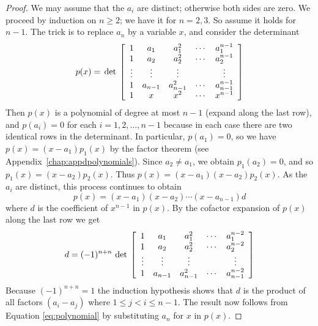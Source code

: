 \begin{proof}
We may assume that the $a_{i}$ are distinct; otherwise both sides are zero. We proceed by induction on $n \geq 2$; we have it for $n = 2, 3$. So assume it holds for $n - 1$. The trick is to replace $a_{n}$ by a variable $x$, and consider the determinant
\begin{equation*}
p(x) = \thinspace\operatorname{det\medspace} \left[ \begin{array}{ccccc}
1 & a_1 & a_1^2 & \cdots & a_1^{n-1} \\
1 & a_2 & a_2^2 & \cdots & a_2^{n-1} \\
\vdots & \vdots & \vdots & & \vdots \\
1 & a_{n-1} & a_{n-1}^2 & \cdots & a_{n-1}^{n-1} \\
1 & x & x^2 & \cdots & x^{n-1} 
\end{array} \right]
\end{equation*}
Then $p(x)$ is a polynomial of degree at most $n - 1$ (expand along the last row), and $p(a_{i}) = 0$ for each $i = 1, 2, \dots, n - 1$ because in each case there are two identical rows in the determinant. In particular, $p(a_{1}) = 0$, so we have $p(x) = (x - a_{1})p_{1}(x)$ by the factor theorem (see Appendix~\ref{chap:appdpolynomials}). Since $a_{2} \neq a_{1}$, we obtain $p_{1}(a_{2}) = 0$, and so $p_{1}(x) = (x - a_{2})p_{2}(x)$. Thus $p(x) = (x - a_{1})(x - a_{2})p_{2}(x)$. As the $a_{i}$ are distinct, this process continues to obtain
\begin{equation}\label{eq:polynomial}
p(x) = (x-a_1)(x-a_2) \cdots (x-a_{n-1})d 
\end{equation}
where $d$ is the coefficient of $x^{n-1}$ in $p(x)$. By the cofactor expansion of $p(x)$ along the last row we get
\begin{equation*}
d = (-1)^{n+n}\thinspace\operatorname{det\medspace} \left[ \begin{array}{ccccc}
1 & a_1 & a_1^2 & \cdots & a_1^{n-2} \\
1 & a_2 & a_2^2 & \cdots & a_2^{n-2} \\
\vdots & \vdots & \vdots & & \vdots \\
1 & a_{n-1} & a_{n-1}^2 & \cdots & a_{n-1}^{n-2} 
\end{array}\right]
\end{equation*}
Because $(-1)^{n+n}=1$ the induction hypothesis shows that $d$ is the product of all factors $(a_{i} - a_{j})$ where $1 \leq j < i \leq n - 1$. The result now follows from Equation \ref{eq:polynomial} by substituting $a_{n}$ for $x$ in $p(x)$.
\end{proof}

